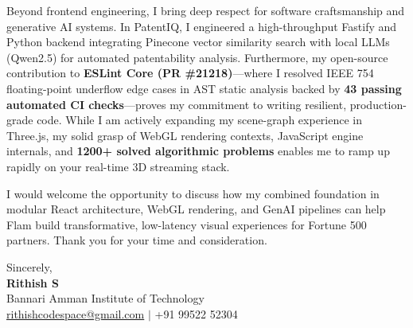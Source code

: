 \documentclass[letterpaper,11pt]{article}
\begin{document}
Beyond frontend engineering, I bring deep respect for software craftsmanship and generative AI systems. In PatentIQ, I engineered a high-throughput Fastify and Python backend integrating Pinecone vector similarity search with local LLMs (Qwen2.5) for automated patentability analysis. Furthermore, my open-source contribution to \textbf{ESLint Core (PR \#21218)}—where I resolved IEEE 754 floating-point underflow edge cases in AST static analysis backed by \textbf{43 passing automated CI checks}—proves my commitment to writing resilient, production-grade code. While I am actively expanding my scene-graph experience in Three.js, my solid grasp of WebGL rendering contexts, JavaScript engine internals, and \textbf{1200+ solved algorithmic problems} enables me to ramp up rapidly on your real-time 3D streaming stack.

I would welcome the opportunity to discuss how my combined foundation in modular React architecture, WebGL rendering, and GenAI pipelines can help Flam build transformative, low-latency visual experiences for Fortune 500 partners. Thank you for your time and consideration.

\vspace{12pt}
Sincerely, \\ \vspace{2pt}
\textbf{Rithish S} \\
\small Bannari Amman Institute of Technology \\
\small \href{mailto:rithishcodespace@gmail.com}{rithishcodespace@gmail.com} $|$ +91 99522 52304
\end{document}

